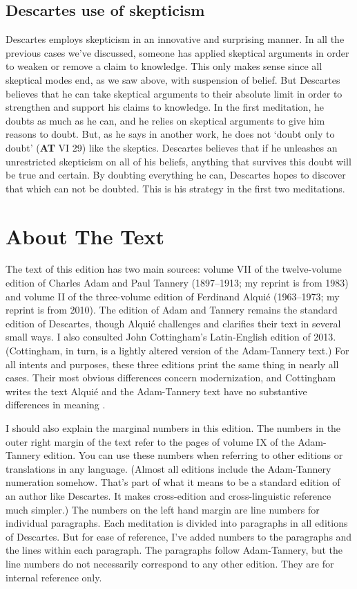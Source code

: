\subsection*{Descartes use of skepticism}

Descartes employs skepticism in an innovative and surprising manner. In all the previous cases we've discussed, someone has applied skeptical arguments in order to weaken or remove a claim to knowledge. This only makes sense since all skeptical modes end, as we saw above, with suspension of belief. But Descartes believes that he can take skeptical arguments to their absolute limit in order to strengthen and support his claims to knowledge. In the first meditation, he doubts as much as he can, and he relies on skeptical arguments to give him reasons to doubt. But, as he says in another work, he does not `doubt only to doubt' (\textbf{AT} VI 29) like the skeptics. Descartes believes that if he unleashes an unrestricted skepticism on all of his beliefs, anything that survives this doubt will be true and certain. By doubting everything he can, Descartes hopes to discover that which can not be doubted. This is his strategy in the first two meditations.

\section*{About The Text}

The text of this edition has two main sources: volume VII of the twelve-volume edition of Charles Adam and Paul Tannery (1897--1913; my reprint is from 1983) and volume II of the three-volume edition of Ferdinand Alquié (1963--1973; my reprint is from 2010). The edition of Adam and Tannery remains the standard edition of Descartes, though Alquié challenges and clarifies their text in several small ways. I also consulted John Cottingham's Latin-English edition of 2013. (Cottingham, in turn, is a lightly altered version of the Adam-Tannery text.) For all intents and purposes, these three editions print the same thing in nearly all cases. Their most obvious differences concern modernization, and Cottingham writes the text Alquié and the Adam-Tannery text have no substantive differences in meaning \citet[xxxii, footnote 5]{cottingham2013}.

I should also explain the marginal numbers in this edition. The numbers in the outer right margin of the text refer to the pages of volume IX of the Adam-Tannery edition. You can use these numbers when referring to other editions or translations in any language. (Almost all editions include the Adam-Tannery numeration somehow. That's part of what it means to be a standard edition of an author like Descartes. It makes cross-edition and cross-linguistic reference much simpler.) The numbers on the left hand margin are line numbers for individual paragraphs. Each meditation is divided into paragraphs in all editions of Descartes. But for ease of reference, I've added numbers to the paragraphs and the lines within each paragraph. The paragraphs follow Adam-Tannery, but the line numbers do not necessarily correspond to any other edition. They are for internal reference only.

